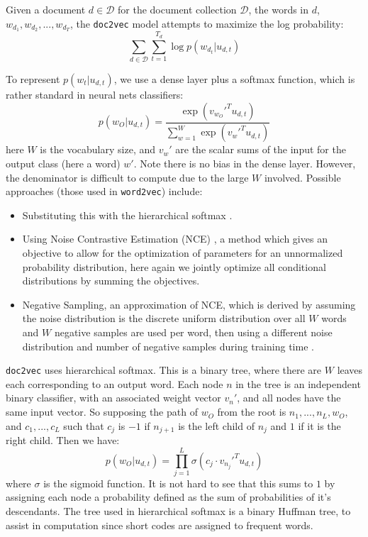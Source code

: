 \documentclass{article}
\begin{document}
Given a document $d\in\mathcal{D}$ for the document collection $\mathcal{D}$, the words in $d$, $w_{d_1},w_{d_2},...,w_{d_T}$, the \texttt{doc2vec} model attempts to maximize the log probability:
    \[\sum_{d\in\mathcal{D}}\sum_{t=1}^{T_d} \log p(w_{d_t}|u_{d,t})\]

To represent $p(w_t|u_{d,t})$, we use a dense layer plus a softmax function, which is rather standard in neural nets classifiers:
    \[p(w_O|u_{d,t})=\frac{\exp(v_{w_O}'^T u_{d,t})}{\sum_{w=1}^W \exp(v_w'^T u_{d,t})}\]
here $W$ is the vocabulary size, and $v_w'$ are the scalar sums of the input for the output class (here a word) $w'$. Note there is no bias in the dense layer. However, the denominator is difficult to compute due to the large $W$ involved. Possible approaches (those used in \texttt{word2vec}) include:
\begin{itemize}
    \item Substituting this with the hierarchical softmax \citep{mnih_scalable_2009}.
    \item Using Noise Contrastive Estimation (NCE) \citep{gutmann_noise-contrastive_2012}, a method which gives an objective to allow for the optimization of parameters for an unnormalized probability distribution, here again we jointly optimize all conditional distributions by summing the objectives.
    \item Negative Sampling, an approximation of NCE, which is derived by assuming the noise distribution is the discrete uniform distribution over all $W$ words and $W$ negative samples are used per word, then using a different noise distribution and number of negative samples during training time \citep{dyer_notes_2014}.
\end{itemize}

\texttt{doc2vec} uses hierarchical softmax. This is a binary tree, where there are $W$ leaves each corresponding to an output word. Each node $n$ in the tree is an independent binary classifier, with an associated weight vector $v_n'$, and all nodes have the same input vector. So supposing the path of $w_O$ from the root is $n_1,...,n_L,w_O$, and $c_1,...,c_L$ such that $c_j$ is $-1$ if $n_{j+1}$ is the left child of ${n_j}$ and $1$ if it is the right child. Then we have:
    \[p(w_O|u_{d,t})=\prod_{j=1}^{L}\sigma(c_j\cdot v_{n_j}'^T u_{d,t})\]
where $\sigma$ is the sigmoid function. It is not hard to see that this sums to $1$ by assigning each node a probability defined as the sum of probabilities of it's descendants. The tree used in hierarchical softmax is a binary Huffman tree, to assist in computation since short codes are assigned to frequent words.
\end{document}
